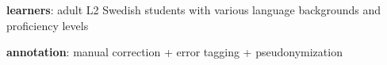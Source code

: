 \item \textbf{learners}: adult L2 Swedish students with various language backgrounds and proficiency levels
            \item \textbf{annotation}: manual correction + error tagging + pseudonymization